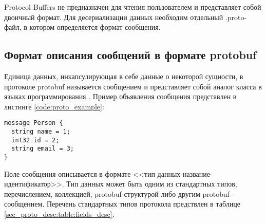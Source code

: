Protocol Buffers не предназначен для чтения пользователем и представляет собой двоичный формат. Для десериализации данных необходим отдельный .proto-файл, в котором определяется формат сообщения.

\subsection{Формат описания сообщений в формате protobuf}

Единица данных, инкапсулирующая в себе данные о некоторой сущности, в протоколе protobuf называется сообщением и представляет собой аналог класса в языках программирования \cite{protobuf_api}.
Пример объявления сообщения представлен в листинге \ref{code:proto_example}:

\begin{lstlisting}[label=code:proto_example, caption={Пример простейшего protobuf-сообщения}]
message Person {
  string name = 1;
  int32 id = 2;
  string email = 3;
}
\end{lstlisting}

Поле сообщения описывается в формате <<тип данных-название-идентификатор>>. Тип данных может быть одним из стандартных типов, перечислением, коллекцией, protobuf-структурой либо другим protobuf-сообщением.
Перечень стандартных типов протокола\cite{protopub_scalar} предствлен в таблице \ref{sec_proto_desc:table:fields_desc}:

